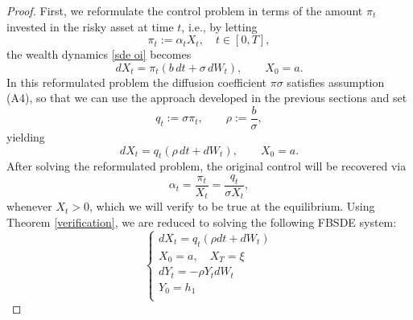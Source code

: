 \documentclass[11pt,a4paper]{article}
\begin{document}
\begin{proof}
First, we reformulate the control problem in terms of the amount $\pi_t$ invested
in the risky asset at time $t$, i.e., by letting
\[
\pi_t:=\alpha_tX_t, \quad t\in [0,T],
\]
the wealth dynamics \eqref{sde oi} becomes
\[
dX_t=\pi_t(b\,dt+\sigma\,dW_t),\qquad X_0=a.
\]
In this reformulated problem the diffusion coefficient \(\pi \sigma\) satisfies assumption (A4), so that we can use the approach developed in the previous sections and set
\[
q_t:=\sigma\pi_t,
\qquad \rho:=\frac b\sigma,
\]
yielding
\[
dX_t=q_t(\rho\,dt+dW_t),\qquad X_0=a.
\]
After solving the reformulated problem, the original control will be recovered via
\[
\alpha_t=\frac{\pi_t}{X_t}=\frac{q_t}{\sigma X_t},
\]
whenever \(X_t>0\), which we will verify to be true at the equilibrium. Using Theorem \ref{verification}, we are reduced to solving the following FBSDE system:
\begin{equation}
\label{FBSDE general 1 oi}
\begin{cases}
    dX_t=  q_t (\rho dt+ dW_t)\\
    X_0=a, \quad X_T=\xi\\
     dY_t=-\rho Y_t dW_t\\
    Y_0=h_1\\
        

\end{cases}
\end{equation}
\end{proof}
\end{document}
